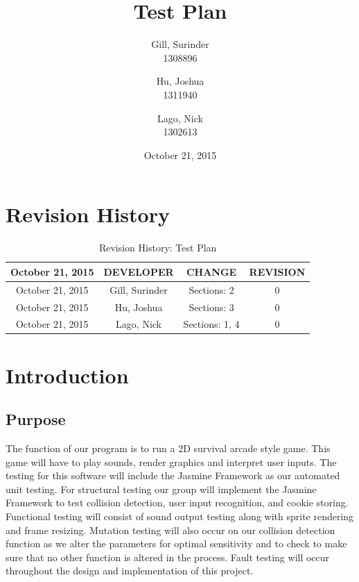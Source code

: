 \documentclass[11pt, oneside]{article}   	%
\title{Test Plan}
\author{Gill, Surinder\\
		1308896
		\and
		Hu, Joshua\\
		1311940
		\and
		Lago, Nick\\
		1302613}
\date{October 21, 2015}							%
\begin{document}
\maketitle

\newpage
\section{Revision History}

\begin{table}[H]
\caption{Revision History: Test Plan}
\begin{center}
\label{tab:}
\begin{tabular}{|c|c|c|c|}
\hline
\textbf{October 21, 2015} & \textbf{DEVELOPER} & \textbf{CHANGE} & \textbf{REVISION}\\
\hline
October 21, 2015 & Gill, Surinder & Sections: 2 & 0\\
\hline
October 21, 2015 & Hu, Joshua & Sections: 3 & 0\\
\hline
October 21, 2015 & Lago, Nick & Sections: 1, 4 & 0\\
\hline
\end{tabular}
\end{center}
\label{default}
\end{table}

\newpage
\tableofcontents
\listoffigures
\listoftables

\newpage
\section{Introduction}
\subsection{Purpose}
The function of our program is to run a 2D survival arcade style game. This game will have to play sounds, render graphics and interpret user inputs. The testing for this software will include the Jasmine Framework as our automated unit testing. For structural testing our group will implement the Jasmine Framework to test collision detection, user input recognition, and cookie storing.  Functional testing will consist of sound output testing along with sprite rendering and frame resizing. Mutation testing will also occur on our collision detection function as we alter the parameters for optimal sensitivity and to check to make sure that no other function is altered in the process. Fault testing will occur throughout the design and implementation of this project.
\end{document}
